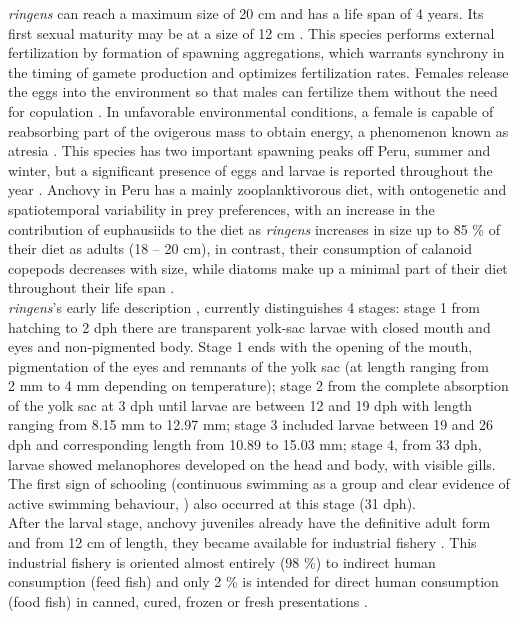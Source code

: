 \textit{\gls{ringens}} can reach a maximum size of 20 cm and has a life span of 4 years. Its first sexual maturity may be at a size of 12 cm \citep{GutiSwar2007,MarzShin2009}. This species performs external fertilization by formation of spawning aggregations, which warrants synchrony in the timing of gamete production and optimizes fertilization rates. Females release the eggs into the environment so that males can fertilize them without the need for copulation \citep{Gani2014}. In unfavorable environmental conditions, a female is capable of reabsorbing part of the ovigerous mass to obtain energy, a phenomenon known as atresia \citep{PereRoqu2008,EspiVera2009,ClarCast2012,BuitPere2018}. This species has two important spawning peaks off Peru, summer and winter, but a significant presence of eggs and larvae is reported throughout the year \citep{MarzShin2009}. Anchovy in Peru has a mainly zooplanktivorous diet, with ontogenetic and spatiotemporal variability in prey preferences, with an increase in the contribution of euphausiids to the diet as \textit{\gls{ringens}} increases in size up to 85 \% of their diet as adults (18 – 20 cm), in contrast, their consumption of calanoid copepods decreases with size, while diatoms make up a minimal part of their diet throughout their life span \citep{EspiBert2008,EspiBert2014}.\\

\textit{\gls{ringens}}’s early life description \citep{RiouOfel2021}, currently distinguishes 4 stages: stage 1 from hatching to 2 \acrfull{dph} there are transparent yolk-sac larvae with closed mouth and eyes and non-pigmented body. Stage 1 ends with the opening of the mouth, pigmentation of the eyes and remnants of the yolk sac (at length ranging from ~ 2 mm to 4 mm depending on temperature); stage 2 from the complete absorption of the yolk sac at 3 \acrshort{dph} until larvae are between 12 and 19 \acrshort{dph} with length ranging from 8.15 mm to 12.97 mm; stage 3 included larvae between 19 and 26 \acrshort{dph} and corresponding length from 10.89 to 15.03 mm; stage 4, from 33 \acrshort{dph}, larvae showed melanophores developed on the head and body, with visible gills. The first sign of schooling (continuous swimming as a group and clear evidence of active swimming behaviour, \cite{Shaw1962}) also occurred at this stage (31 \acrshort{dph}).\\

After the larval stage, anchovy juveniles already have the definitive adult form and from 12 cm of length, they became available for industrial fishery \citep{MarzShin2009}. This industrial fishery is oriented almost entirely (98 \%) to indirect human consumption (feed fish) and only 2 \% is intended for direct human consumption (food fish) in canned, cured, frozen or fresh presentations \citep{FreoSuei2014}.\\

